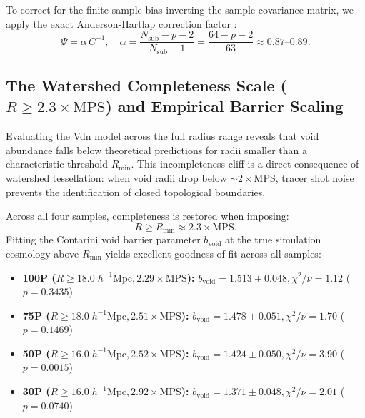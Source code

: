 \documentclass[12pt]{report}
\begin{document}
To correct for the finite-sample bias inverting the sample covariance matrix, we apply the exact Anderson-Hartlap correction factor \citep{Hartlap2007}:
\begin{equation}
    \Psi = \alpha\, C^{-1}, \quad \alpha = \frac{N_{\mathrm{sub}} - p - 2}{N_{\mathrm{sub}} - 1} = \frac{64 - p - 2}{63} \approx 0.87\text{--}0.89.
\end{equation}

\subsection{The Watershed Completeness Scale ($R \ge 2.3 \times \mathrm{MPS}$) and Empirical Barrier Scaling}

Evaluating the Vdn model across the full radius range reveals that void abundance falls below theoretical predictions for radii smaller than a characteristic threshold $R_{\mathrm{min}}$. This incompleteness cliff is a direct consequence of watershed tessellation: when void radii drop below $\sim 2 \times \mathrm{MPS}$, tracer shot noise prevents the identification of closed topological boundaries.

Across all four samples, completeness is restored when imposing:
\begin{equation}
    R \ge R_{\mathrm{min}} \approx 2.3 \times \mathrm{MPS}.
\end{equation}
Fitting the Contarini void barrier parameter $b_{\mathrm{void}}$ at the true simulation cosmology above $R_{\mathrm{min}}$ yields excellent goodness-of-fit across all samples:
\begin{itemize}
    \item \textbf{100P ($R \ge 18.0\;h^{-1}\mathrm{Mpc}, 2.29\times\mathrm{MPS}$):} $b_{\mathrm{void}} = 1.513 \pm 0.048, \chi^2/\nu = 1.12$ ($p = 0.3435$)
    \item \textbf{75P ($R \ge 18.0\;h^{-1}\mathrm{Mpc}, 2.51\times\mathrm{MPS}$):} $b_{\mathrm{void}} = 1.478 \pm 0.051, \chi^2/\nu = 1.70$ ($p = 0.1469$)
    \item \textbf{50P ($R \ge 16.0\;h^{-1}\mathrm{Mpc}, 2.52\times\mathrm{MPS}$):} $b_{\mathrm{void}} = 1.424 \pm 0.050, \chi^2/\nu = 3.90$ ($p = 0.0015$)
    \item \textbf{30P ($R \ge 16.0\;h^{-1}\mathrm{Mpc}, 2.92\times\mathrm{MPS}$):} $b_{\mathrm{void}} = 1.371 \pm 0.048, \chi^2/\nu = 2.01$ ($p = 0.0740$)
\end{itemize}
\end{document}
